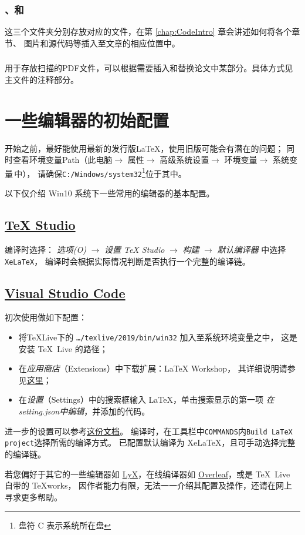 \subsubsection{、和}
这三个文件夹分别存放对应的文件，在第 \ref{chap:CodeIntro} 章会讲述如何将各个章节、
图片和源代码等插入至文章的相应位置中。
\subsubsection{}
用于存放扫描的PDF文件，可以根据需要插入和替换论文中某部分。具体方式见主文件的注释部分。

\section{一些编辑器的初始配置}
开始之前，最好能使用最新的发行版\LaTeX{}，使用旧版可能会有潜在的问题；
同时查看环境变量Path（此电脑$\to$ 属性$\to$ 高级系统设置$\to$
环境变量$\to$ 系统变量\,中），
请确保\texttt{C:/Windows/system32}\footnote{盘符 C 表示系统所在盘}位于其中。

以下仅介绍 Win10 系统下一些常用的编辑器的基本配置。
\subsection{\href{http://texstudio.sourceforge.net}{\TeX{} Studio}}
编译时选择\XeLaTeX{}：
\emph{选项(O)} $\to$ \emph{设置 TeX Studio} $\to$
\emph{构建} $\to$ \emph{默认编译器} 中选择\texttt{XeLaTeX}，
编译时会根据实际情况判断是否执行一个完整的编译链。

\subsection{\href{https://code.visualstudio.com}{Visual Studio Code}}
初次使用做如下配置：
\begin{itemize}
	\item 将\TeX{}Live下的 \texttt{\dots /texlive/2019/bin/win32} 加入至系统环境变量之中，
			这是安装 \TeX\ Live 的路径；
	\item 在\emph{应用商店}（Extensions）中下载扩展：\textsf{LaTeX Workshop}，
			其详细说明请参见\href{https://github.com/James-Yu/LaTeX-Workshop}{这里}；%
	\item 在\emph{设置}（Settings）中的搜索框输入 LaTeX，单击搜索显示的第一项
			\emph{在setting.json中编辑}，并添加的代码。
\end{itemize}
进一步的设置可以参考\href{https://github.com/EthanDeng/vscode-latex/}{这份文档}。
编译时，在工具栏中\texttt{COMMANDS}内\texttt{Build LaTeX project}选择所需的编译方式。
已配置默认编译为 XeLaTeX，且可手动选择完整的编译链。

若您偏好于其它的一些编辑器如 \href{http://www.lyx.org/}{LyX}，在线编译器如
\href{https://www.overleaf.com/}{Overleaf}，或是 \TeX\ Live 自带的 TeXworks，
因作者能力有限，无法一一介绍其配置及操作，还请在网上寻求更多帮助。